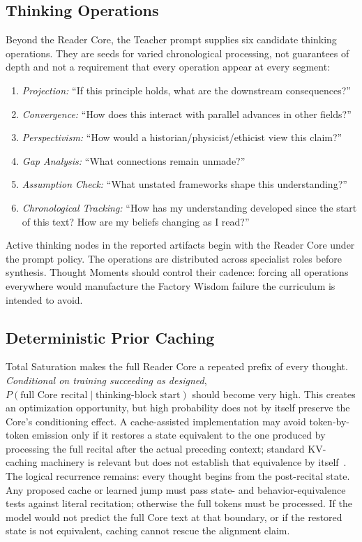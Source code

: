 \subsection{Thinking Operations}

Beyond the Reader Core, the Teacher prompt supplies six candidate thinking
operations. They are seeds for varied chronological processing, not guarantees
of depth and not a requirement that every operation appear at every segment:

\begin{enumerate}
    \item \emph{Projection:} ``If this principle holds, what are the downstream consequences?''
    \item \emph{Convergence:} ``How does this interact with parallel advances in other fields?''
    \item \emph{Perspectivism:} ``How would a historian/physicist/ethicist view this claim?''
    \item \emph{Gap Analysis:} ``What connections remain unmade?''
    \item \emph{Assumption Check:} ``What unstated frameworks shape this understanding?''
    \item \emph{Chronological Tracking:} ``How has my understanding developed since the start of this text? How are my beliefs changing as I read?''
\end{enumerate}

\noindent Active thinking nodes in the reported artifacts begin with the Reader
Core under the prompt policy. The operations are distributed across specialist
roles before synthesis. Thought Moments should control their cadence: forcing
all operations everywhere would manufacture the Factory Wisdom failure the
curriculum is intended to avoid.


\subsection{Deterministic Prior Caching}
\label{sec:identity-caching}

Total Saturation makes the full Reader Core a repeated prefix of every thought.
\emph{Conditional on training succeeding as designed},
$P(\text{full Core recital} \mid \text{thinking-block start})$ should become very high. This
creates an optimization opportunity, but high probability does not by itself
preserve the Core's conditioning effect. A cache-assisted implementation may
avoid token-by-token emission only if it restores a state equivalent to the one
produced by processing the full recital after the actual preceding context;
standard KV-caching machinery is relevant but does not establish that
equivalence by itself~\cite{kwon2023efficient}. The logical recurrence remains:
every thought begins from the post-recital state. Any proposed cache or learned
jump must pass state- and behavior-equivalence tests against literal recitation;
otherwise the full tokens must be processed. If the model would not predict the
full Core text at that boundary, or if the restored state is not equivalent,
caching cannot rescue the alignment claim.

